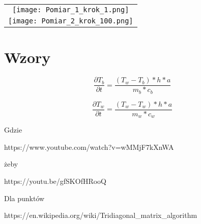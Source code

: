 \documentclass[varwidth,12pt,a4paper]{article}
\begin{document}
\begin{tabular}{c}
    \texttt{[image: Pomiar\_1\_krok\_1.png]} \\
    \texttt{[image: Pomiar\_2\_krok\_100.png]} 
\end{tabular}

\section{Wzory}

\begin{equation}
    \frac{\partial T_b}{\partial t}=\frac{(T_w-T_b)*h*a}{m_b*c_b}
\end{equation}

\begin{equation}
    \frac{\partial T_w}{\partial t}=\frac{(T_w-T_w)*h*a}{m_w*c_w}
\end{equation}

Gdzie 

https://www.youtube.com/watch?v=wMMjF7kXnWA

żeby 

https://youtu.be/gfSKOfHRooQ



Dla punktów 

https://en.wikipedia.org/wiki/Tridiagonal_matrix_algorithm
\end{document}
